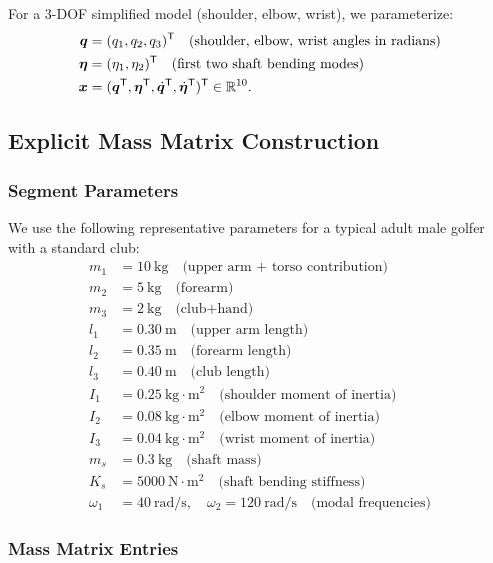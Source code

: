 For a 3-DOF simplified model (shoulder, elbow, wrist), we parameterize:
\begin{align}
\bm{q} &= (q_1, q_2, q_3)^{\mathsf{T}} \quad \text{(shoulder, elbow, wrist angles in radians)} \\
\bm{\eta} &= (\eta_1, \eta_2)^{\mathsf{T}} \quad \text{(first two shaft bending modes)} \\
\bm{x} &= (\bm{q}^{\mathsf{T}}, \bm{\eta}^{\mathsf{T}}, \dot{\bm{q}}^{\mathsf{T}}, \dot{\bm{\eta}}^{\mathsf{T}})^{\mathsf{T}} \in \mathbb{R}^{10}.
\end{align}

\subsection{Explicit Mass Matrix Construction}

\subsubsection{Segment Parameters}

We use the following representative parameters for a typical adult male golfer with a
standard club:
\begin{align}
m_1 &= 10~\text{kg} \quad \text{(upper arm + torso contribution)} \\
m_2 &= 5~\text{kg} \quad \text{(forearm)} \\
m_3 &= 2~\text{kg} \quad \text{(club+hand)} \\
l_1 &= 0.30~\text{m} \quad \text{(upper arm length)} \\
l_2 &= 0.35~\text{m} \quad \text{(forearm length)} \\
l_3 &= 0.40~\text{m} \quad \text{(club length)} \\
I_1 &= 0.25~\text{kg$\cdot$m$^2$} \quad \text{(shoulder moment of inertia)} \\
I_2 &= 0.08~\text{kg$\cdot$m$^2$} \quad \text{(elbow moment of inertia)} \\
I_3 &= 0.04~\text{kg$\cdot$m$^2$} \quad \text{(wrist moment of inertia)} \\
m_s &= 0.3~\text{kg} \quad \text{(shaft mass)} \\
K_s &= 5000~\text{N$\cdot$m$^2$} \quad \text{(shaft bending stiffness)} \\
\omega_1 &= 40~\text{rad/s}, \quad \omega_2 = 120~\text{rad/s} \quad \text{(modal frequencies)}
\end{align}

\subsubsection{Mass Matrix Entries}


